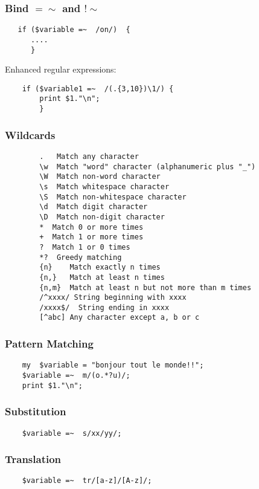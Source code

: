 \documentclass[oldfontcommands,oneside,a4paper,11pt]{article}
\begin{document}
\subsubsection{Bind $=\sim$ and  $!\sim$}
\begin{verbatim}
   if ($variable =~  /on/)  { 
      ....
      }
 \end{verbatim} %
 
Enhanced regular expressions:
 
 \begin{verbatim}
    if ($variable1 =~  /(.{3,10})\1/) {
        print $1."\n";
        }
\end{verbatim} %



\subsubsection{Wildcards}
\begin{verbatim}
    	.   Match any character
    	\w  Match "word" character (alphanumeric plus "_")
    	\W  Match non-word character
    	\s  Match whitespace character
    	\S  Match non-whitespace character
    	\d  Match digit character
    	\D  Match non-digit character
    	*  Match 0 or more times
    	+  Match 1 or more times
    	?  Match 1 or 0 times
    	*?  Greedy matching
    	{n}    Match exactly n times
    	{n,}   Match at least n times
    	{n,m}  Match at least n but not more than m times
    	/^xxxx/	String beginning with xxxx
    	/xxxx$/  String ending in xxxx
    	[^abc] Any character except a, b or c
\end{verbatim} %

\subsubsection{Pattern Matching}
\begin{verbatim}
    my  $variable = "bonjour tout le monde!!";
    $variable =~  m/(o.*?u)/;
    print $1."\n";
\end{verbatim} %


\subsubsection{Substitution}
\begin{verbatim}
    $variable =~  s/xx/yy/;
\end{verbatim} %

\subsubsection{Translation}
\begin{verbatim}
    $variable =~  tr/[a-z]/[A-z]/;
\end{verbatim} %
\end{document}
